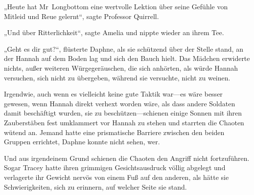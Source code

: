 \later

„Heute hat Mr~Longbottom eine wertvolle Lektion über seine Gefühle von Mitleid und Reue gelernt“, sagte Professor Quirrell.

„Und über Ritterlichkeit“, sagte Amelia und nippte wieder an ihrem Tee.

\later

„Geht es dir gut?“, flüsterte Daphne, als sie schützend über der Stelle stand, an der Hannah auf dem Boden lag und sich den Bauch hielt. Das Mädchen erwiderte nichts, außer weiteren Würgegeräuschen, die sich anhörten, als würde Hannah versuchen, sich nicht zu übergeben, während sie versuchte, nicht zu weinen.

Irgendwie, auch wenn es vielleicht keine gute Taktik war—es wäre besser gewesen, wenn Hannah direkt verhext worden wäre, als dass andere Soldaten damit beschäftigt wurden, sie zu beschützen—schienen einige Sonnen mit ihren Zauberstäben fest umklammert vor Hannah zu stehen und starrten die Chaoten wütend an. Jemand hatte eine prismatische Barriere zwischen den beiden Gruppen errichtet, Daphne konnte nicht sehen, wer.

Und aus irgendeinem Grund schienen die Chaoten den Angriff nicht fortzuführen. Sogar Tracey hatte ihren grimmigen Gesichtsausdruck völlig abgelegt und verlagerte ihr Gewicht nervös von einem Fuß auf den anderen, als hätte sie Schwierigkeiten, sich zu erinnern, auf welcher Seite sie stand.

